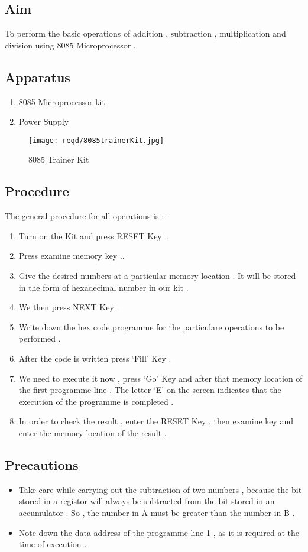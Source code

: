\documentclass[14pt]{article}
\begin{document}
\subsection{Aim}
To perform the basic operations of addition , subtraction , multiplication and division using 8085 Microprocessor .

\subsection{Apparatus}
\begin{enumerate}
	\item{8085 Microprocessor kit}
	\item{Power Supply}
\end{enumerate}

\begin{figure}[h]
	\centering
	\texttt{[image: reqd/8085trainerKit.jpg]}
	\caption{8085 Trainer Kit}
\end{figure}

\subsection{Procedure}
The general procedure for all operations is :-
\begin{enumerate}
	\item{Turn on the Kit and press RESET Key ..}
	\item{Press examine memory key ..}
	\item{Give the desired numbers at a particular memory location . It will be stored in the form of hexadecimal number in our kit .}
	\item{We then press NEXT Key .}
	\item{Write down the hex code programme for the particulare operations to be performed .}
	\item{After the code is written press `Fill' Key .}
	\item{We need to execute it now , press `Go' Key and after that memory location of the first programme line . The letter `E' on the screen indicates that the execution of the programme is completed .}
	\item{In order to check the result , enter the RESET Key , then examine key and enter the memory location of the result .}
\end{enumerate}

\subsection{Precautions}
\begin{itemize}
	\item{Take care while carrying out the subtraction of two numbers , because the bit stored in a registor will always be subtracted from the bit stored in an accumulator . So , the number in A must be greater than the number in B .}
	\item{Note down the data address of the programme line 1 , as it is required at the time of execution .}
\end{itemize}
\end{document}
